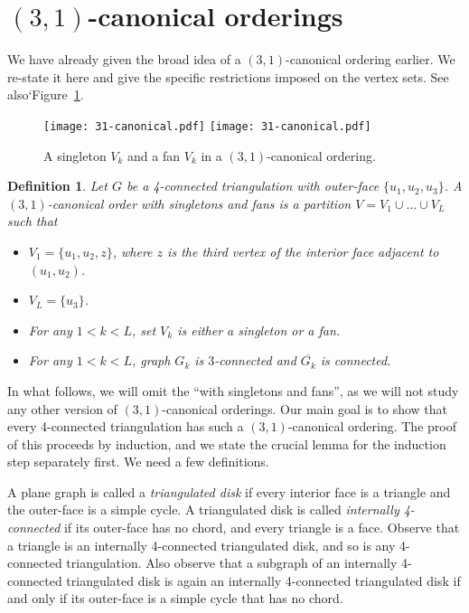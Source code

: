 \documentclass[12pt]{article}
\newtheorem{definition}{Definition}
\begin{document}
\section{$(3,1)$-canonical orderings}


We have already given the broad idea of a $(3,1)$-canonical ordering
earlier.  We re-state it here and give the specific
restrictions imposed  on the vertex sets.  See also`Figure~\ref{fig:fan}.

\begin{figure}[ht]
\hspace*{\fill}
\texttt{[image: 31-canonical.pdf]}
\hspace*{\fill}
\texttt{[image: 31-canonical.pdf]}
\hspace*{\fill}
\caption{A singleton $V_k$ and a fan $V_k$ in a $(3,1)$-canonical
ordering.}
\label{fig:fan}
\end{figure}

\begin{definition}
Let $G$ be a 4-connected triangulation with outer-face $\{u_1,u_2,u_3\}$.
A {\em $(3,1)$-canonical order with singletons and fans} is a partition $V=V_1\cup \dots \cup V_L$
such that
\begin{itemize}
\item $V_1=\{u_1,u_2,z\}$, where $z$ is the third vertex of the
	interior face adjacent to $(u_1,u_2)$.
\item $V_L=\{u_3\}$.
\item For any $1<k<L$, set $V_k$ is either a singleton or a fan.
\item For any $1<k<L$, graph $G_k$ is $3$-connected 
	and $\overline{G_k}$ is connected.
\end{itemize}
\end{definition}

In what follows, we will omit the ``with singletons and fans'', as we
will not study any other version of $(3,1)$-canonical orderings.
Our main goal is to show that every 4-connected triangulation
has such a $(3,1)$-canonical ordering.  The proof of this proceeds
by induction, and we state the crucial lemma for the induction
step separately first.  We need a few definitions.

A plane graph is called a {\em triangulated disk} if every interior
face is a triangle and the outer-face is a simple cycle.
A triangulated disk is called {\em internally 4-connected} if its
outer-face has no chord, and every triangle is a face.
Observe that a triangle is an internally 4-connected triangulated disk,
and so is any 4-connected triangulation.  Also observe that a subgraph
of an internally 4-connected triangulated disk is again an internally
4-connected triangulated disk if and only if its outer-face is a simple
cycle that has no chord.
\end{document}
